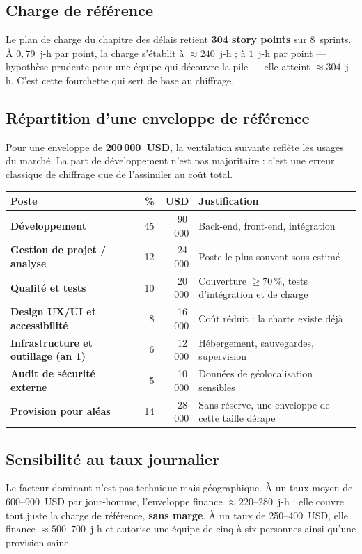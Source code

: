 \subsection{Charge de référence}
Le plan de charge du chapitre des délais retient \textbf{304 story points} sur
8~sprints. À $0{,}79$~j-h par point, la charge s'établit à $\approx 240$~j-h ;
à $1$~j-h par point --- hypothèse prudente pour une équipe qui découvre la pile
--- elle atteint $\approx 304$~j-h. C'est cette fourchette qui sert de base au
chiffrage.

\subsection{Répartition d'une enveloppe de référence}
Pour une enveloppe de \textbf{200\,000~USD}, la ventilation suivante reflète les
usages du marché. La part de développement n'est pas majoritaire : c'est une
erreur classique de chiffrage que de l'assimiler au coût total.

\begin{xltabular}{\textwidth}{>{\bfseries}p{5.2cm} r r X}
\toprule
\textbf{Poste} & \textbf{\%} & \textbf{USD} & \textbf{Justification} \\
\midrule
\endhead
Développement & 45 & 90\,000 & Back-end, front-end, intégration \\
Gestion de projet / analyse & 12 & 24\,000 & Poste le plus souvent sous-estimé \\
Qualité et tests & 10 & 20\,000 & Couverture $\geq 70\,\%$, tests d'intégration et de charge \\
Design UX/UI et accessibilité & 8 & 16\,000 & Coût réduit : la charte existe déjà \\
Infrastructure et outillage (an 1) & 6 & 12\,000 & Hébergement, sauvegardes, supervision \\
Audit de sécurité externe & 5 & 10\,000 & Données de géolocalisation sensibles \\
Provision pour aléas & 14 & 28\,000 & Sans réserve, une enveloppe de cette taille dérape \\
\bottomrule
\end{xltabular}

\subsection{Sensibilité au taux journalier}
Le facteur dominant n'est pas technique mais géographique. À un taux moyen de
600--900~USD par jour-homme, l'enveloppe finance $\approx 220$--$280$~j-h :
elle couvre tout juste la charge de référence, \textbf{sans marge}. À un taux de
250--400~USD, elle finance $\approx 500$--$700$~j-h et autorise une équipe de
cinq à six personnes ainsi qu'une provision saine.

